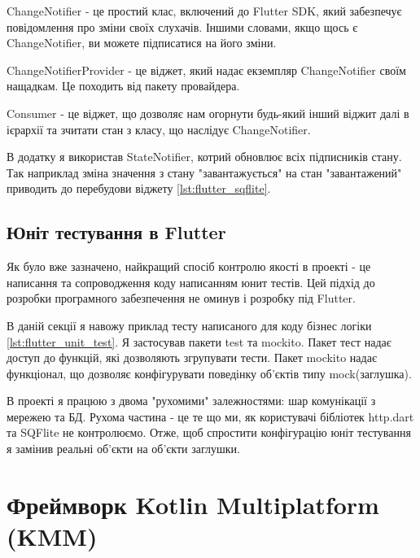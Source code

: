 \begin{itemize}
    \begin{item}
        ChangeNotifier - це простий клас, включений до Flutter SDK,
        який забезпечує повідомлення про зміни своїх слухачів.
        Іншими словами, якщо щось є ChangeNotifier, ви можете підписатися на його зміни.
    \end{item}
    \begin{item}
        ChangeNotifierProvider - це віджет, який надає екземпляр ChangeNotifier своїм нащадкам.
        Це походить від пакету провайдера.
    \end{item}
    \begin{item}
        Consumer - це віджет, що дозволяє нам огорнути будь-який інший віджит далі
        в ієрархії та зчитати стан з класу, що наслідує ChangeNotifier.
    \end{item}
\end{itemize}

В додатку я використав StateNotifier, котрий обновлює всіх підписників стану.
Так наприклад зміна значення з стану "завантажується" на стан "завантажений"
приводить до перебудови віджету \ref{lst:flutter_sqflite}.

\subsection{Юніт тестування в Flutter}
\label{sec:flutter_unit_testing_app}
Як було вже зазначено, найкращий спосіб контролю якості в проекті - це написання та сопроводження коду написанням юнит тестів.
Цей підхід до розробки програмного забезпечення не оминув і розробку під Flutter.

В даній секції я навожу приклад тесту написаного для коду бізнес логіки \ref{lst:flutter_unit_test}.
Я застосував пакети test та mockito.
Пакет тест надає доступ до функцій, які дозволяють згрупувати тести.
Пакет mockito надає функціонал, що дозволяє конфігурувати поведінку об'єктів типу mock(заглушка).

В проекті я працюю з двома "рухомими" залежностями: шар комунікації з мережею та БД.
Рухома частина - це те що ми, як користувачі бібліотек http.dart та SQFlite не контролюємо.
Отже, щоб спростити конфігурацію юніт тестування я замінив реальні об'єкти на об'єкти заглушки.


\section{Фреймворк Kotlin Multiplatform (KMM)}
\label{sec:kmm}

